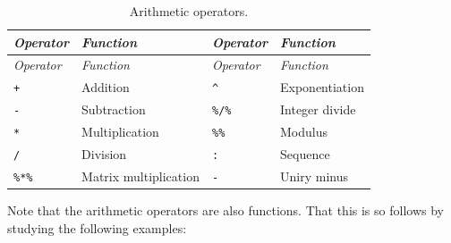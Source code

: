 \documentclass[
]{book}
\begin{document}
\begin{longtable}[]{@{}
  >{\raggedright\arraybackslash}p{}
  >{\raggedright\arraybackslash}p{}
  >{\raggedright\arraybackslash}p{}
  >{\raggedright\arraybackslash}p{}@{}}
\caption{\label{tab:ArithOperators} Arithmetic operators.}\tabularnewline
\toprule\noalign{}
\begin{minipage}[b]{\linewidth}\raggedright
\emph{{Operator}}
\end{minipage} & \begin{minipage}[b]{\linewidth}\raggedright
\emph{{Function}}
\end{minipage} & \begin{minipage}[b]{\linewidth}\raggedright
\emph{{Operator}}
\end{minipage} & \begin{minipage}[b]{\linewidth}\raggedright
\emph{{Function}}
\end{minipage} \\
\midrule\noalign{}
\endfirsthead
\toprule\noalign{}
\begin{minipage}[b]{\linewidth}\raggedright
\emph{{Operator}}
\end{minipage} & \begin{minipage}[b]{\linewidth}\raggedright
\emph{{Function}}
\end{minipage} & \begin{minipage}[b]{\linewidth}\raggedright
\emph{{Operator}}
\end{minipage} & \begin{minipage}[b]{\linewidth}\raggedright
\emph{{Function}}
\end{minipage} \\
\midrule\noalign{}
\endhead
\bottomrule\noalign{}
\endlastfoot
\texttt{+} & Addition & \texttt{\^{}} & Exponentiation \\
\texttt{-} & Subtraction & \texttt{\%/\%} & Integer divide \\
\texttt{*} & Multiplication & \texttt{\%\%} & Modulus \\
\texttt{/} & Division & \texttt{:} & Sequence \\
\texttt{\%*\%} & Matrix multiplication & \texttt{-} & Uniry minus \\
\end{longtable}

Note that the arithmetic operators are also functions. That this is so follows by studying the following examples:
\end{document}
